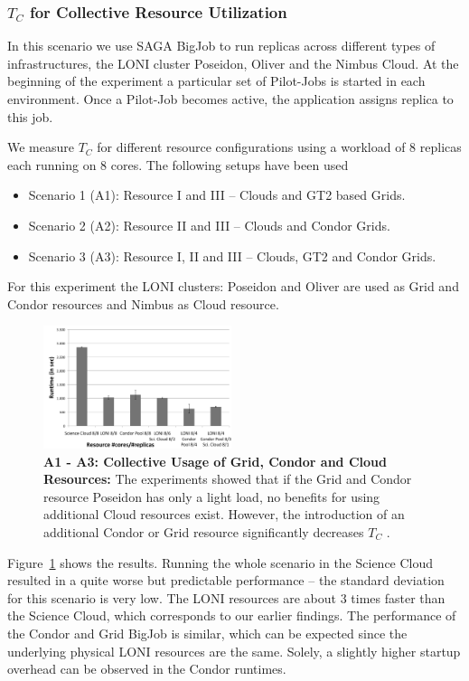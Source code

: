 \documentclass[conference,final]{IEEEtran}
\newcommand{\tc}{$T_{C}$ }
\begin{document}
\subsubsection{\tc for Collective Resource Utilization}

In this scenario we use SAGA BigJob to run replicas across
different types of infrastructures, the LONI
cluster Poseidon, Oliver and the Nimbus Cloud. 
At the beginning of the experiment a particular set of
Pilot-Jobs is started in each environment. Once a Pilot-Job becomes
active, the application assigns replica to this job. 

We measure \tc for different resource configurations using a workload
of 8 replicas each running on 8 cores. The following setups have been used
\begin{itemize}
\item Scenario 1 (A1): Resource I and III -- Clouds and GT2 based Grids. 
\item Scenario 2 (A2): Resource II and III -- Clouds and Condor Grids.
\item Scenario 3 (A3): Resource I, II and III -- Clouds, GT2 and Condor Grids.
\end{itemize} 
For this experiment the LONI clusters: Poseidon and Oliver are used as Grid and Condor resources and
Nimbus as Cloud resource.

\begin{figure}[htbp]
    \centering
        \includegraphics[width=0.49\textwidth]{performance/8replica_scenario_grid_condor_cloud}
        \caption{\textbf{A1 - A3: Collective Usage of Grid, Condor and
            Cloud Resources: } The experiments showed that if the Grid
          and Condor resource Poseidon has only a light load, no
          benefits for using additional Cloud resources
          exist. However, the introduction of an additional Condor
          or Grid resource significantly decreases \tc.}
    \label{fig:performance_8replica_grid_cloud_condor}
\end{figure}

Figure~\ref{fig:performance_8replica_grid_cloud_condor} shows the results. 
Running the whole scenario in the Science Cloud resulted
in a quite worse but predictable performance -- the standard deviation for this scenario
is very low. The LONI resources are about 3 times faster than
the Science Cloud, which corresponds to our earlier findings. 
The performance of the Condor and Grid BigJob is similar, which can 
be expected since the underlying physical LONI resources are the same. 
Solely, a slightly higher startup overhead can be observed in the Condor runtimes.
\end{document}
